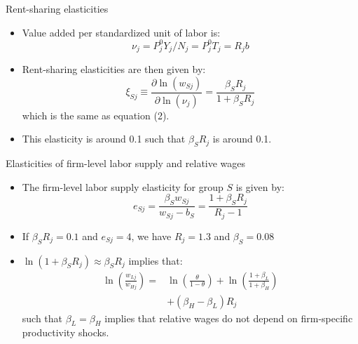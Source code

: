 \documentclass[notes=show]{beamer}
\begin{document}
\begin{frame}{Rent-sharing elasticities}
\begin{itemize}
\item Value added per standardized unit of labor is:
\begin{equation*}
    \nu_{j} = P_{j}^{0}Y_{j}/N_{j}=P_{j}^{0}T_{j}=R_{j}b
\end{equation*}
\item Rent-sharing elasticities are then given by:
\begin{equation*}
    \xi_{Sj} \equiv \frac{\partial \ln(w_{Sj})}{\partial \ln(\nu_{j})} = \frac{\beta_{S}R_{j}}{1+\beta_{S}R_{j}}
\end{equation*}
which is the same as equation (2). \medskip
\item This elasticity is around 0.1 such that $\beta_{S}R_{j}$ is around 0.1.
\end{itemize}
\end{frame}

\begin{frame}{Elasticities of firm-level labor supply and relative wages}
\begin{itemize}
\item The firm-level labor supply elasticity for group $S$ is given by:
\begin{equation*}
    e_{Sj} = \frac{\beta_{S}w_{Sj}}{w_{Sj}-b_{S}} = \frac{1+\beta_{S}R_{j}}{R_{j}-1}
\end{equation*}
\item If $\beta_{S}R_{j}=0.1$ and $e_{Sj}=4$, we have $R_{j}=1.3$ and $\beta_{S}=0.08$ \medskip
\item $\ln(1+\beta_{S}R_{j}) \approx \beta_{S}R_{j}$ implies that:
\begin{align*}
    \ln \left( \frac{w_{Lj}}{w_{Hj}} \right) = & \ln \left( \frac{\theta}{1-\theta} \right) + \ln \left( \frac{1+\beta_{L}}{1+\beta_{H}} \right) \tag{14}  \\
    & + (\beta_{H} - \beta_{L})R_{j} 
\end{align*}
such that $\beta_{L}=\beta_{H}$ implies that relative wages do not depend on firm-specific productivity shocks.
\end{itemize}
\end{frame}
\end{document}
